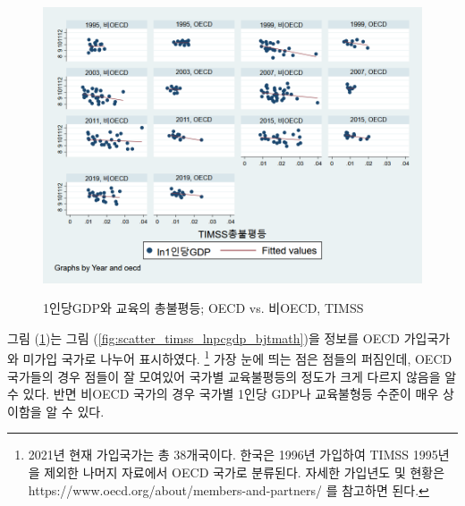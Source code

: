 \begin{figure}
    \centering
    \caption{1인당GDP와 교육의 총불평등; OECD vs. 비OECD, TIMSS}
    \includegraphics[width=\textwidth]{figure/scatter_lnpcgdp_totmath_timss_oecd.png}
    \label{fig:scatter_timss_lnpcgdp_bjtmath_oecd}
\end{figure}

그림 (\ref{fig:scatter_timss_lnpcgdp_bjtmath_oecd})는 그림 (\ref{fig:scatter_timss_lnpcgdp_bjtmath})을 정보를 OECD 가입국가와 미가입 국가로 나누어 표시하였다.
\footnote{2021년 현재 가입국가는 총 38개국이다. 한국은 1996년 가입하여 TIMSS 1995년을 제외한 나머지 자료에서 OECD 국가로 분류된다. 자세한 가입년도 및 현황은 https://www.oecd.org/about/members-and-partners/ 를 참고하면 된다.}
가장 눈에 띄는 점은 점들의 퍼짐인데, OECD 국가들의 경우 점들이 잘 모여있어 국가별 교육불평등의 정도가 크게 다르지 않음을 알 수 있다. 반면 비OECD 국가의 경우 국가별 1인당 GDP나 교육불형등 수준이 매우 상이함을 알 수 있다.

